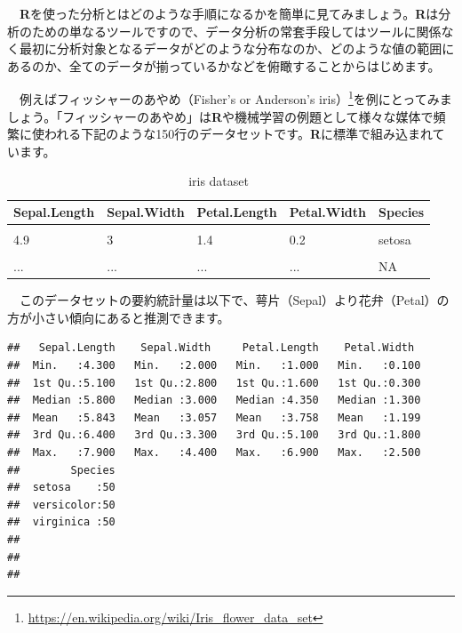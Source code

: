 \documentclass[
  12pt,
]{book}
\DeclareRobustCommand{\href}[2]{#2\footnote{\url{#1}}}
\begin{document}
　\textbf{R}を使った分析とはどのような手順になるかを簡単に見てみましょう。\textbf{R}は分析のための単なるツールですので、データ分析の常套手段してはツールに関係なく最初に分析対象となるデータがどのような分布なのか、どのような値の範囲にあるのか、全てのデータが揃っているかなどを俯瞰することからはじめます。

　例えば\href{https://en.wikipedia.org/wiki/Iris_flower_data_set}{フィッシャーのあやめ（Fisher's or Anderson's iris）}を例にとってみましょう。「フィッシャーのあやめ」は\textbf{R}や機械学習の例題として様々な媒体で頻繁に使われる下記のような150行のデータセットです。\textbf{R}に標準で組み込まれています。

\begin{table}[H]

\caption{\label{tab:iris}iris dataset}
\centering
\fontsize{10}{12}\selectfont
\begin{tabular}[t]{lllll}
\toprule
Sepal.Length & Sepal.Width & Petal.Length & Petal.Width & Species\\
\midrule
\cellcolor{gray!6}{5.1} & \cellcolor{gray!6}{3.5} & \cellcolor{gray!6}{1.4} & \cellcolor{gray!6}{0.2} & \cellcolor{gray!6}{setosa}\\
4.9 & 3 & 1.4 & 0.2 & setosa\\
\cellcolor{gray!6}{4.7} & \cellcolor{gray!6}{3.2} & \cellcolor{gray!6}{1.3} & \cellcolor{gray!6}{0.2} & \cellcolor{gray!6}{setosa}\\
... & ... & ... & ... & NA\\
\bottomrule
\end{tabular}
\end{table}

　このデータセットの要約統計量は以下で、萼片（Sepal）より花弁（Petal）の方が小さい傾向にあると推測できます。

\begin{verbatim}
##   Sepal.Length    Sepal.Width     Petal.Length    Petal.Width   
##  Min.   :4.300   Min.   :2.000   Min.   :1.000   Min.   :0.100  
##  1st Qu.:5.100   1st Qu.:2.800   1st Qu.:1.600   1st Qu.:0.300  
##  Median :5.800   Median :3.000   Median :4.350   Median :1.300  
##  Mean   :5.843   Mean   :3.057   Mean   :3.758   Mean   :1.199  
##  3rd Qu.:6.400   3rd Qu.:3.300   3rd Qu.:5.100   3rd Qu.:1.800  
##  Max.   :7.900   Max.   :4.400   Max.   :6.900   Max.   :2.500  
##        Species  
##  setosa    :50  
##  versicolor:50  
##  virginica :50  
##                 
##                 
## 
\end{verbatim}
\end{document}
